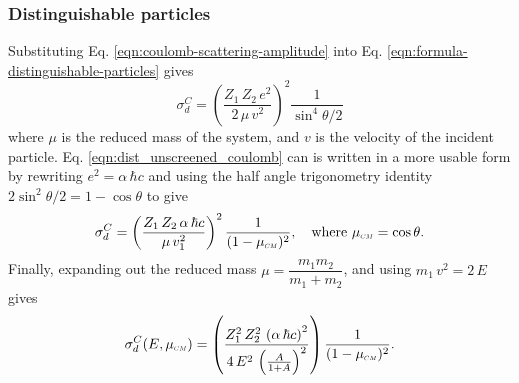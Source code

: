 \subsubsection{Distinguishable particles}
Substituting Eq. \eqref{eqn:coulomb-scattering-amplitude} into Eq. \eqref{eqn:formula-distinguishable-particles} gives
\begin{equation} \label{eqn:dist_unscreened_coulomb}
    \sigma_{d}^{C} = \left(\dfrac{Z_1 \, Z_2 \, e^2}{2 \, \mu \, v^2}\right)^2 \dfrac{1}{\sin^4 \theta/2}
\end{equation}
where $\mu$ is the reduced mass of the system, and $v$ is the velocity of the incident particle. Eq. \eqref{eqn:dist_unscreened_coulomb} can is written in a more usable form by rewriting $e^2 = \alpha \, \hbar c$ and using the half angle trigonometry identity $2 \sin^2 \theta / 2 = 1 - \cos \theta$ to give
\begin{equation}
    \sigma_{d}^{C} = \left(\dfrac{Z_1 \, Z_2 \, \alpha \, \hbar c}{\mu \, v_1^2}\right)^2 \dfrac{1}{(1 - \mucm)^2}, \quad \text{where} \,\, \mucm = \cos \theta.
\end{equation}
Finally, expanding out the reduced mass $\mu = \dfrac{m_1 m_2}{m_1 + m_2}$, and using $m_1 \, v^2 = 2 \, E$ gives
\begin{equation} \label{eqn:coulomb-dcs}
    \sigma_{d}^{C}(E,\mucm) = \left(\dfrac{Z_1^2 \, Z_2^2 \, \left(\alpha \, \hbar c\right)^2}{ 4 \, E^2 \, \left(\frac{A}{1 + A} \right)^2}\right) \dfrac{1}{(1 - \mucm)^2}.
\end{equation}

